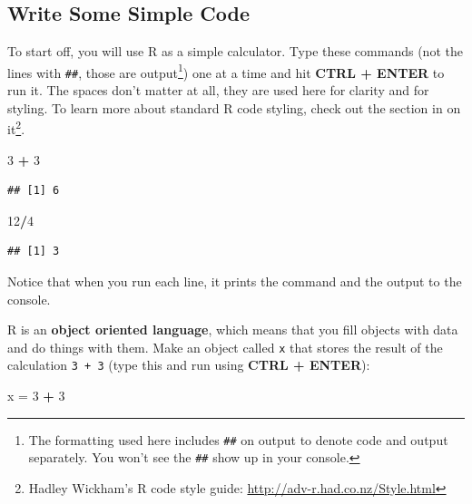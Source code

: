 \documentclass[]{book}
\newenvironment{Shaded}{\begin{snugshade}}{\end{snugshade}}
\newcommand{\DecValTok}[1]{\textcolor[rgb]{0.00,0.00,0.81}{#1}}
\newcommand{\StringTok}[1]{\textcolor[rgb]{0.31,0.60,0.02}{#1}}
\newcommand{\OperatorTok}[1]{\textcolor[rgb]{0.81,0.36,0.00}{\textbf{#1}}}
\newcommand{\NormalTok}[1]{#1}
\let\rmarkdownfootnote\footnote%
\def\footnote{\protect\rmarkdownfootnote}
\theoremstyle{definition}
\theoremstyle{definition}
\theoremstyle{definition}
\theoremstyle{remark}
\begin{document}
\subsection{Write Some Simple Code}\label{write-some-simple-code}

To start off, you will use R as a simple calculator. Type these commands
(not the lines with \texttt{\#\#}, those are output\footnote{The
  formatting used here includes \texttt{\#\#} on output to denote code
  and output separately. You won't see the \texttt{\#\#} show up in your
  console.}) one at a time and hit \textbf{CTRL + ENTER} to run it. The
spaces don't matter at all, they are used here for clarity and for
styling. To learn more about standard R code styling, check out the
section in \citet{adv-r-cite} on it\footnote{Hadley Wickham's R code
  style guide: \url{http://adv-r.had.co.nz/Style.html}}.

\begin{Shaded}
\begin{Highlighting}[]
\DecValTok{3} \OperatorTok{+}\StringTok{ }\DecValTok{3}
\end{Highlighting}
\end{Shaded}

\begin{verbatim}
## [1] 6
\end{verbatim}

\begin{Shaded}
\begin{Highlighting}[]
\DecValTok{12}\OperatorTok{/}\DecValTok{4}
\end{Highlighting}
\end{Shaded}

\begin{verbatim}
## [1] 3
\end{verbatim}

Notice that when you run each line, it prints the command and the output
to the console.

R is an \textbf{object oriented language}, which means that you fill
objects with data and do things with them. Make an object called
\texttt{x} that stores the result of the calculation \texttt{3\ +\ 3}
(type this and run using \textbf{CTRL + ENTER}):

\begin{Shaded}
\begin{Highlighting}[]
\NormalTok{x =}\StringTok{ }\DecValTok{3} \OperatorTok{+}\StringTok{ }\DecValTok{3}
\end{Highlighting}
\end{Shaded}
\end{document}
